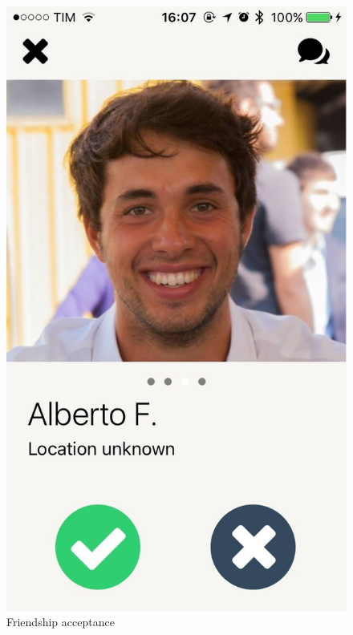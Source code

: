 \newpage

\begin{multicols}{2}
\begin{figure}[H]
\centering
\centering
\includegraphics[scale=0.15]{./images/friendship_acc.jpg}
\caption{\label{Expo Map}Friendship acceptance}
\end{figure}


\end{multicols}
